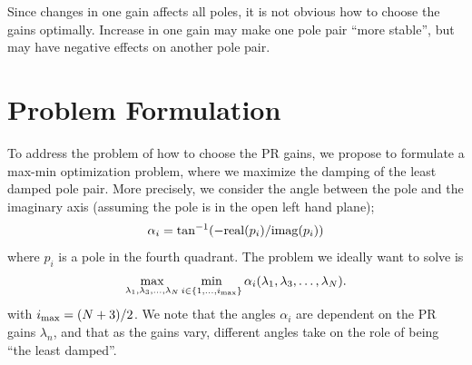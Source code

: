 \documentclass[conference,10pt]{IEEEtran}
\begin{document}
Since changes in one gain affects all poles, it is not obvious how to choose the gains optimally. Increase in one gain may make one pole pair ``more stable'', but may have negative effects on another pole pair.






\section{Problem Formulation}
To address the problem of how to choose the PR gains, we propose to formulate a max-min optimization problem, where we maximize the damping of the least damped pole pair. More precisely, we consider the angle between the pole and the imaginary axis (assuming the pole is in the open left hand plane);
\begin{align*}
\alpha_i = \tan^{-1}(-{\rm real}(p_i) / {\rm imag}(p_i))
\end{align*}
where $p_i$ is a pole in the fourth quadrant. The problem we ideally want to solve is
\begin{align}
\label{eq:MaxMinProb}
\max_{\lambda_1,\lambda_3,\dots, \lambda_N}\min_{i\in \{1, \dots, i_{\rm max}\}} \alpha_i(\lambda_1,\lambda_3,\dots, \lambda_N).
\end{align}
with $i_{\rm max} = (N+3)/2$. We note that the angles $\alpha_i$ are dependent on the PR gains $\lambda_n$, and that as the gains vary, different angles take on the role of being ``the least damped''.

\end{document}
